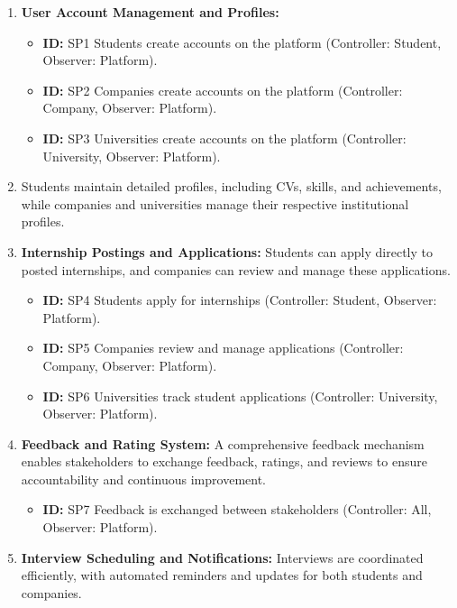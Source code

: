 \begin{enumerate}
    \item \textbf{User Account Management and Profiles:}
    \begin{itemize}
        \item \textbf{ID:} SP1 Students create accounts on the platform (Controller: Student, Observer: Platform).
        \item \textbf{ID:} SP2 Companies create accounts on the platform (Controller: Company, Observer: Platform).
        \item \textbf{ID:} SP3 Universities create accounts on the platform (Controller: University, Observer: Platform).
    \end{itemize}

\item Students maintain detailed profiles, including CVs, skills, and achievements, while companies and universities manage their respective institutional profiles.
    
\item \textbf{Internship Postings and Applications:}
Students can apply directly to posted internships, and companies can review and manage these applications.
\begin{itemize}
    \item \textbf{ID:} SP4 Students apply for internships (Controller: Student, Observer: Platform).
    \item \textbf{ID:} SP5 Companies review and manage applications (Controller: Company, Observer: Platform).
    \item \textbf{ID:} SP6 Universities track student applications (Controller: University, Observer: Platform).
\end{itemize}

\item \textbf{Feedback and Rating System:}
A comprehensive feedback mechanism enables stakeholders to exchange feedback, ratings, and reviews to ensure accountability and continuous improvement.
\begin{itemize}
    \item \textbf{ID:} SP7 Feedback is exchanged between stakeholders (Controller: All, Observer: Platform).
\end{itemize}

\item \textbf{Interview Scheduling and Notifications:}
Interviews are coordinated efficiently, with automated reminders and updates for both students and companies.


\end{enumerate}

